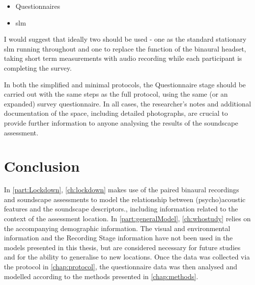 \begin{itemize}
  \item Questionnaires
  \item \gls{slm}
\end{itemize}

I would suggest that ideally two  should be used - one as the standard stationary \gls{slm} running throughout and one to replace the function of the binaural headset, taking short term measurements with audio recording while each participant is completing the survey.

In both the simplified and minimal protocols, the Questionnaire stage should be carried out with the same steps as the full protocol, using the same (or an expanded) survey questionnaire. In all cases, the researcher's notes and additional documentation of the space, including detailed photographs, are crucial to provide further information to anyone analysing the results of the soundscape assessment.

\section{Conclusion}

In \cref{part:Lockdown}, \cref{ch:lockdown} makes use of the paired binaural recordings and soundscape assessments to model the relationship between (psycho)acoustic features and the soundscape descriptors., including information related to the context of the assessment location. In \cref{part:generalModel}, \cref{ch:whostudy} relies on the accompanying demographic information. The visual and environmental information and the Recording Stage information have not been used in the models presented in this thesis, but are considered necessary for future studies and for the ability to generalise to new locations. Once the data was collected via the protocol in \cref{chap:protocol}, the questionnaire data was then analysed and modelled according to the methods presented in \cref{chap:methods}.